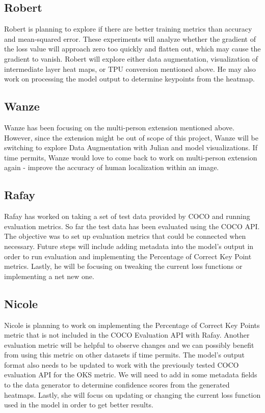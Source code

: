 \documentclass[11pt, letterpaper]{article}
\begin{document}
\subsection{Robert}
Robert is planning to explore if there are better training metrics than accuracy and mean-squared error. These experiments will analyze whether the gradient of the loss value will approach zero too quickly and flatten out, which may cause the gradient to vanish. Robert will explore either data augmentation, visualization of intermediate layer heat maps, or TPU conversion mentioned above. He may also work on processing the model output to determine keypoints from the heatmap. 
\subsection{Wanze}
Wanze has been focusing on the multi-person extension mentioned above. However, since the extension might be out of scope of this project, Wanze will be switching to explore Data Augmentation with Julian and model visualizations. If time permits, Wanze would love to come back to work on  multi-person extension again - improve the accuracy of human localization within an image. 
\subsection{Rafay}
Rafay has worked on taking a set of test data provided by COCO and running evaluation metrics. So far the test data has been evaluated using the COCO API. The objective was to set up evaluation metrics that could be connected when necessary. Future steps will include adding metadata into the model’s output in order to run evaluation and implementing the Percentage of Correct Key Point metrics. Lastly, he will be focusing on tweaking the current loss functions or implementing a net new one.   
\subsection{Nicole}
Nicole is planning to work on implementing the Percentage of Correct Key Points metric that is not included in the COCO Evaluation API with Rafay. Another evaluation metric will be helpful to observe changes and we can possibly benefit from using this metric on other datasets if time permits. The model’s output format also needs to be updated to work with the previously tested COCO evaluation API for the OKS metric. We will need to add in some metadata fields to the data generator to determine confidence scores from the generated heatmaps. Lastly, she will focus on updating or changing the current loss function used in the model in order to get better results.
\end{document}
